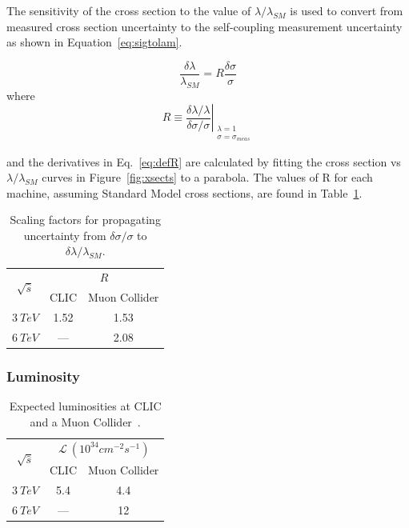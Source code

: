 \documentclass[12pt]{article}
\begin{document}
The sensitivity of the cross section to the value of $\lambda/\lambda_{SM}$ is used to convert  from measured cross section uncertainty to the self-coupling measurement uncertainty as shown in Equation~\ref{eq:sigtolam}.

\begin{equation}
	\frac{\delta\lambda}{\lambda_{SM}} = R \frac{\delta\sigma}{\sigma}\label{eq:sigtolam}
\end{equation}
where
\begin{equation}
	R \equiv \left.\frac{\delta\lambda/\lambda} {\delta \sigma/\sigma}\right|_{\substack{\lambda=1 \\ \sigma=\sigma_{meas}}}\label{eq:defR}
\end{equation}

and the derivatives in Eq.~\ref{eq:defR} are calculated by fitting the cross section vs $\lambda/\lambda_{SM}$ curves in Figure~\ref{fig:xsects} to a parabola. The values of R for each machine, assuming Standard Model cross sections, are found in Table~\ref{table:Rs}.

\begin{table}
	\centering
	\begin{tabular}{|c | c | c|}
		\hline
		\multirow{2}{*}{$\sqrt{\hat{s}}$}	& \multicolumn{2}{|c|}{$R$} \\
		\cline{2-3}
		& CLIC	& Muon Collider \\ \hline
		$3~TeV$	& 1.52	& 1.53 \\ \hline
		$6~TeV$	& ---	& 2.08 \\ \hline
	\end{tabular}
	\caption{Scaling factors for propagating uncertainty from $\delta \sigma/\sigma$ to $\delta \lambda/\lambda_{SM}$.}\label{table:Rs}
\end{table}

\subsubsection{Luminosity}

\begin{table}
	\centering
	\begin{tabular}{|c | c | c|}
		\hline
		\multirow{2}{*}{$\sqrt{\hat{s}}$}	& \multicolumn{2}{|c|}{$\mathcal{L}~(10^{34}cm^{-2}s^{-1})$} \\
		\cline{2-3}
		& CLIC	& Muon Collider \\ \hline
		$3~TeV$	& 5.4	& 4.4 \\ \hline
		$6~TeV$	& ---	& 12 \\ \hline
	\end{tabular}
	\caption{Expected luminosities at CLIC and a Muon Collider~\cite{clic-physics,usmap}.}\label{table:Ls}
\end{table}
\end{document}
